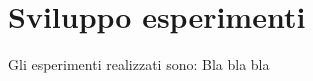 \section{Sviluppo esperimenti}
\label{sec:esperimenti}

Gli esperimenti realizzati sono: Bla bla bla
